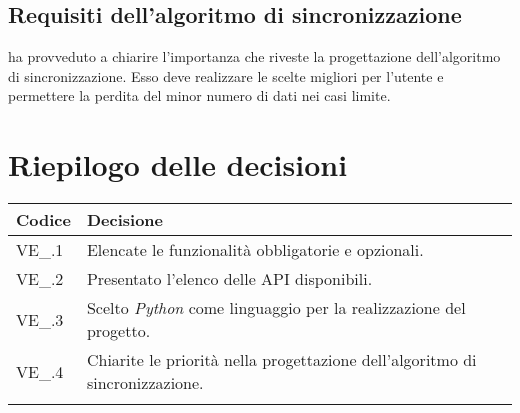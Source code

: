 \subsection{Requisiti dell'algoritmo di sincronizzazione}
\Alessio{} ha provveduto a chiarire l'importanza che riveste la progettazione dell'algoritmo di sincronizzazione. Esso deve realizzare le scelte migliori per l'utente e permettere la perdita del minor numero di dati nei casi limite.


\newpage

\section{Riepilogo delle decisioni \hfil}
{
	\setlength{\freewidth}{\dimexpr\textwidth-4\tabcolsep}
	\renewcommand{\arraystretch}{1.5}
	\setlength{\aboverulesep}{0pt}
	\setlength{\belowrulesep}{0pt}
	\begin{longtable}{L{.3\freewidth} L{.7\freewidth}}
		\toprule 
		\textbf{Codice} & \textbf{Decisione}\\
		\toprule
		\endhead
		
		VE\_\DataMeeting{}.1 & Elencate le funzionalità obbligatorie e opzionali. \\  
		VE\_\DataMeeting{}.2 & Presentato l'elenco delle API disponibili.\\
		VE\_\DataMeeting{}.3 & Scelto \textit{Python} come linguaggio per la realizzazione del progetto. \\ 
		VE\_\DataMeeting{}.4 & Chiarite le priorità nella progettazione dell'algoritmo di sincronizzazione. \\		
		\bottomrule
		\hiderowcolors
	\end{longtable}
}